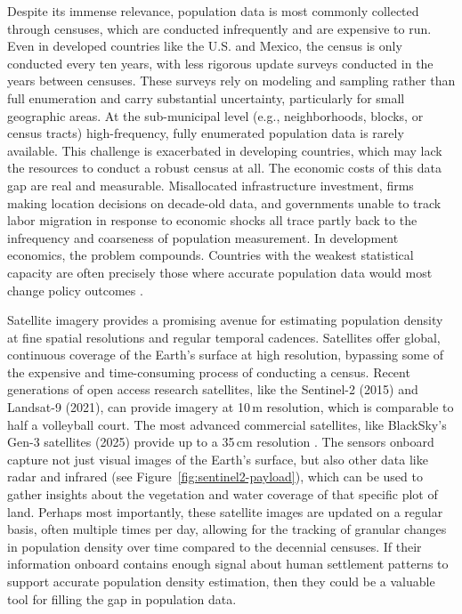 \documentclass[12pt,letterpaper]{article}
\begin{document}
Despite its immense relevance, population data is most commonly collected through censuses, which are conducted infrequently and are expensive to run. Even in developed countries like the U.S. and Mexico, the census is only conducted every ten years, with less rigorous update surveys conducted in the years between censuses. These surveys rely on modeling and sampling rather than full enumeration and carry substantial uncertainty, particularly for small geographic areas. At the sub-municipal level (e.g., neighborhoods, blocks, or census tracts) high-frequency, fully enumerated population data is rarely available. This challenge is exacerbated in developing countries, which may lack the resources to conduct a robust census at all. The economic costs of this data gap are real and measurable. Misallocated infrastructure investment, firms making location decisions on decade-old data, and governments unable to track labor migration in response to economic shocks all trace partly back to the infrequency and coarseness of population measurement. In development economics, the problem compounds. Countries with the weakest statistical capacity are often precisely those where accurate population data would most change policy outcomes \parencite{Jerven2013}.

Satellite imagery provides a promising avenue for estimating population density at fine spatial resolutions and regular temporal cadences. Satellites offer global, continuous coverage of the Earth's surface at high resolution, bypassing some of the expensive and time-consuming process of conducting a census. Recent generations of open access research satellites, like the Sentinel-2 (2015) and Landsat-9 (2021), can provide imagery at 10\,m resolution, which is comparable to half a volleyball court. The most advanced commercial satellites, like BlackSky's Gen-3 satellites (2025) provide up to a 35\,cm resolution \parencite{BlackSkyGen3}. The sensors onboard capture not just visual images of the Earth's surface, but also other data like radar and infrared (see Figure~\ref{fig:sentinel2-payload}), which can be used to gather insights about the vegetation and water coverage of that specific plot of land. Perhaps most importantly, these satellite images are updated on a regular basis, often multiple times per day, allowing for the tracking of granular changes in population density over time compared to the decennial censuses. If their information onboard contains enough signal about human settlement patterns to support accurate population density estimation, then they could be a valuable tool for filling the gap in population data. 
\end{document}
